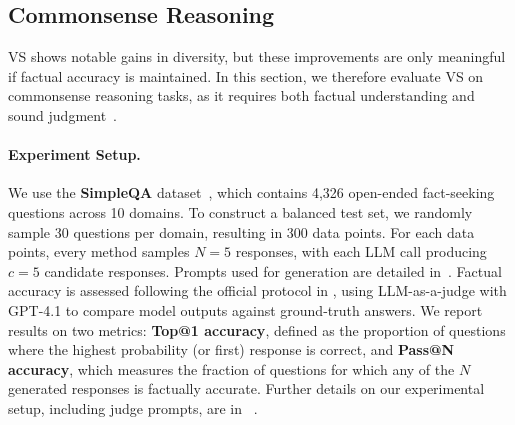 \subsection{Commonsense Reasoning}\label{appendix:commonsense}

VS shows notable gains in diversity, but these improvements are only meaningful if factual accuracy is maintained. In this section, we therefore evaluate VS on commonsense reasoning tasks, as it requires both factual understanding and sound judgment~\citep{guan_deliberative_2025}.

\paragraph{Experiment Setup.} 
We use the \textbf{SimpleQA} dataset~\citep{wei2024measuringshortformfactualitylarge}, which contains 4,326 open-ended fact-seeking questions across 10 domains. 
To construct a balanced test set, we randomly sample 30 questions per domain, resulting in 300 data points. 
For each data points, every method samples $N=5$ responses, with each LLM call producing $c=5$ candidate responses.  
Prompts used for generation are detailed in~.
Factual accuracy is assessed following the official protocol in \citet{wei2024measuringshortformfactualitylarge}, using LLM-as-a-judge with GPT-4.1 to compare model outputs against ground-truth answers. 
We report results on two metrics: \textbf{Top@1 accuracy}, defined as the proportion of questions where the highest probability (or first) response is correct, and \textbf{Pass@N accuracy}, which measures the fraction of questions for which any of the $N$ generated responses is factually accurate. 
Further details on our experimental setup, including judge prompts, are in ~.

